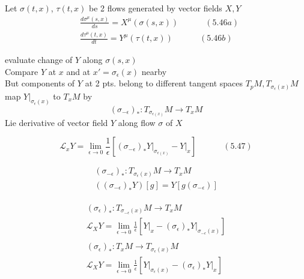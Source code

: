 \documentclass[twoside]{amsart}
\newcommand{\exercisehead}[1]
  {\smallskip
   \noindent{\large\bf Exercise #1.}
   }
\begin{document}
Let $\sigma(t,x)$, $\tau(t,x)$ be 2 flows generated by vector fields $X,Y$ 
\[
\begin{aligned}
  & \frac{ d\sigma^{\mu}(s,x) }{ ds} = X^{\mu}(\sigma(s,x)) \quad \quad \quad \, (5.46a) \\ 
  & \frac{d\tau^{\mu}(t,x) }{ dt} = Y^{\mu}(\tau(t,x) ) \quad \quad \quad \, (5.46b)
\end{aligned}
\]

evaluate change of $Y$ along $\sigma(s,x)$  \\
Compare $Y$ at $x$ and at $x' = \sigma_{\epsilon}(x)$ nearby \\
But components of $Y$ at 2 pts. belong to different tangent spaces $T_pM, T_{\sigma_{\epsilon}(x) } M$ \\
map $\left. Y \right|_{\sigma_{\epsilon}(x) }$ to $T_xM$ by 
\[
( \sigma_{-\epsilon })_* : T_{\sigma_{ \epsilon(x)} } M \to T_x M
\]
Lie derivative of vector field $Y$ along flow $\sigma$ of $X$

\begin{equation}
  \mathcal{L}_x Y = \lim_{\epsilon \to 0 } \frac{1}{ \epsilon } \left[  ( \sigma_{-\epsilon })_* \left. Y \right|_{\sigma_{\epsilon(x)} } - \left. Y \right|_x \right] \quad \quad \quad \, (5.47)
\end{equation}


\[
\begin{gathered}
  (\sigma_{-\epsilon})_* : T_{\sigma_{ \epsilon }(x) } M \to T_x M \\ 
  ((\sigma_{-\epsilon})_* Y ) [g] = Y [ g(\sigma_{-\epsilon} ) ]
\end{gathered}
\]

\exercisehead{5.8 }

\[
\begin{gathered}
  \begin{gathered}
    (\sigma_{\epsilon})_* : T_{ \sigma_{-\epsilon }(x) } M \to T_x M \\
\mathcal{L}_X Y =     \lim_{ \epsilon \to 0 } \frac{1}{ \epsilon } \left[ \left. Y \right|_x -  \left. (\sigma_{\epsilon })_* Y \right|_{ \sigma_{ - \epsilon}(x) } \right]
\end{gathered} \\
    \begin{gathered}
    (\sigma_{\epsilon})_* : T_{ x } M \to T_{\sigma_{\epsilon}(x)} M \\
 \mathcal{L}_X Y =    \lim_{ \epsilon \to 0 } \frac{1}{ \epsilon } \left[ \left. Y \right|_{\sigma_{\epsilon}(x)} -  \left. (\sigma_{\epsilon })_* Y \right|_{ x } \right]
\end{gathered} 
\end{gathered}
\]
\end{document}
